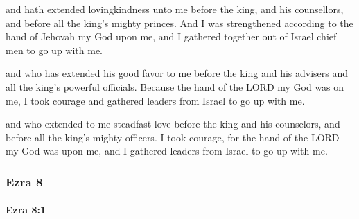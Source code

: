 			\begin{versebox}
					\item[BHS] 
					\item[LXX] 
					\item[ASV] and hath extended lovingkindness unto me before the king, and his counsellors, and before all the king's mighty princes. And I was strengthened according to the hand of Jehovah my God upon me, and I gathered together out of Israel chief men to go up with me.
					\item[NIV] and who has extended his good favor to me before the king and his advisers and all the king’s powerful officials. Because the hand of the LORD my God was on me, I took courage and gathered leaders from Israel to go up with me.
					\item[NRSV] and who extended to me steadfast love before the king and his counselors, and before all the king’s mighty officers. I took courage, for the hand of the LORD my God was upon me, and I gathered leaders from Israel to go up with me.
			\end{versebox}
	\subsubsection{Ezra 8} %
		\label{EZRA-8}

		\paragraph{Ezra 8:1} %
			\label{EZRA-8-1}

